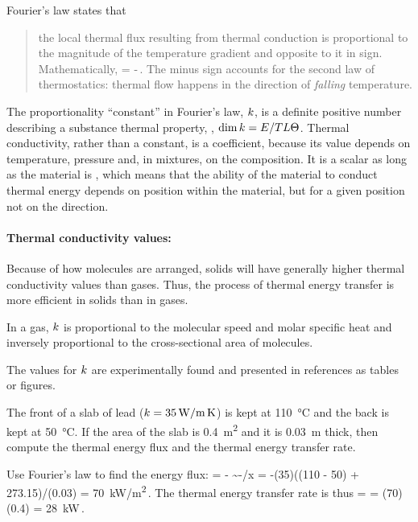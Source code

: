 Fourier's law states that
\begin{quote}
the local thermal flux resulting from thermal conduction is proportional to the magnitude of the temperature gradient and opposite to it in sign. Mathematically,
\beq
\flux\then = -\kthcond\grad\temp\,.
\eeq
The minus sign accounts for the second law of thermostatics: thermal flow happens in the direction of \emph{falling} temperature.
\end{quote}

The proportionality ``constant'' in Fourier's law, $k$, is a definite positive number describing a substance thermal property, , $\dim k = E/TL\Theta$. Thermal conductivity, rather than a constant, is a coefficient, because its value depends on temperature, pressure and, in mixtures, on the composition. It is a scalar as long as the material is , which means that the ability of the material to conduct thermal energy depends on position within the material, but for a given position not on the direction.

\paragraph{Thermal conductivity values:}
Because of how molecules are arranged, solids will have generally higher thermal conductivity values than gases. Thus, the process of thermal energy transfer is more efficient in solids than in gases. 

In a gas, $k$ is proportional to the molecular speed and molar specific heat and inversely proportional to the cross-sectional area of molecules.

The values for $k$ are experimentally found and presented in references as tables or figures.

\begin{example}
The front of a slab of lead ($k = \SI{35}{W/m.K}$) is kept at \SI{110}{\celsius} and the back is kept at \SI{50}{\celsius}. If the area of the slab is \SI{0.4}{m^2} and it is \SI{0.03}{m} thick, then compute the thermal energy flux and the thermal energy transfer rate.
\end{example}

\begin{solution}
Use Fourier's law to find the energy flux:
\beq
\flux\then = -\kthcond\grad\temp
           \sim -\kthcond\Dx\temp/\Dx x
           = -(35)((110 - 50) + 273.15)/(0.03)
           = \SI{70}{kW/m^2}\,.
\eeq
The thermal energy transfer rate is thus
\beq
\flow\then = \flux\then\surf
           = (70)(0.4) 
           = \SI{28}{kW}\,.\mqed
\eeq
\end{solution}


